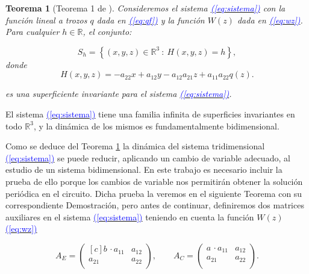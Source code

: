 \documentclass[12pt,a4paper]{report} %
\newtheorem{theorem}{Teorema}[chapter]
\newcommand{\eref}[1]{\hyperref[#1]{\textcolor{blue}{(\ref*{#1})}}}
\newcommand{\eref}[1]{\hyperref[#1]{\textcolor{blue}{\textit{(\ref*{#1})}}}}
\begin{document}
	\begin{theorem}[Teorema 1 de \cite{ponce}]
		\label{teorema1}
		Consideremos el sistema \eref{eq:sistema} con la función lineal a trozos $q$ dada en \eref{eq:qf} y la función $W(z)$ dada en \eref{eq:wz}. Para cualquier $h \in \mathbb{R}$, el conjunto:
		
		\begin{equation}
			\label{eq:sh}
			S_h=\left\{(x,y,z)\in \mathbb{R}^3\: : \: H(x,y,z)=h \right\},
		\end{equation}
		donde
		\begin{equation}
			\label{eq:hecuation}
			H(x,y,z)=-a_{22}x+a_{12}y-a_{12}a_{21}z+a_{11}a_{22}q(z).
		\end{equation}\smallskip
		
		\noindent es una superficiente invariante para el sistema \eref{eq:sistema}.
		
		\end{theorem}
		
		\vspace{0.5cm}\noindent El sistema \eref{eq:sistema} tiene una familia infinita de superficies invariantes en todo $\mathbb{R}^3$, y la dinámica de los mismos es fundamentalmente bidimensional.
	
	\newpage
	
	\vspace{0.5cm}Como se deduce del Teorema \ref{teorema1} la dinámica del sistema tridimensional \eref{eq:sistema} se puede reducir, aplicando un cambio de variable adecuado, al estudio de un sistema bidimensional. En este trabajo es necesario incluir la prueba de ello porque los cambios de variable nos permitirán obtener la solución periódica en el circuito. Dicha prueba la veremos en el siguiente Teorema con su correspondiente Demostración, pero antes de continuar, definiremos dos matrices auxiliares en el sistema \eref{eq:sistema} teniendo en cuenta la función $W(z)$ \eref{eq:wz}
	
	\begin{equation}
		A_E=\begin{pmatrix*}[c]
			b \, \cdotp a_{11} & a_{12}\\
			a_{21} & a_{22}\\
		\end{pmatrix*}, \qquad 	A_C=\begin{pmatrix*}
			a \, \cdotp a_{11} & a_{12}\\
			a_{21} & a_{22}\\
		\end{pmatrix*}.
	\end{equation}\smallskip
	
\end{document}
